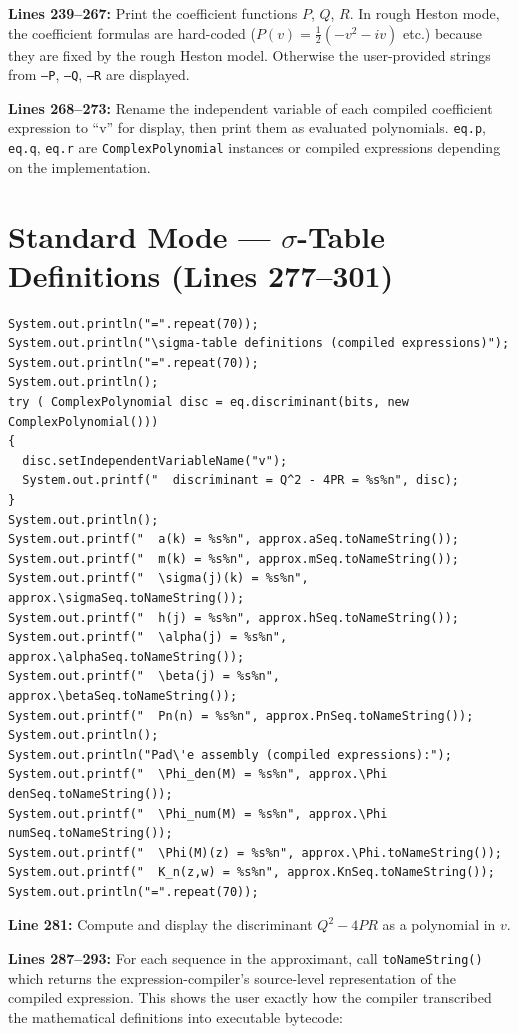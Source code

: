\documentclass[a4paper,11pt]{article}
\begin{document}
\textbf{Lines 239--267:} Print the coefficient functions $P$, $Q$, $R$. In
rough Heston mode, the coefficient formulas are hard-coded
($P(v) = \frac12(-v^2 - iv)$ etc.) because they are fixed by the rough Heston
model. Otherwise the user-provided strings from \texttt{--P}, \texttt{--Q},
\texttt{--R} are displayed.

\textbf{Lines 268--273:} Rename the independent variable of each compiled
coefficient expression to ``v'' for display, then print them as evaluated
polynomials. \texttt{eq.p}, \texttt{eq.q}, \texttt{eq.r} are
\texttt{ComplexPolynomial} instances or compiled expressions depending on the
implementation.

\section{Standard Mode --- $\sigma$-Table Definitions (Lines 277--301)}

\begin{lstlisting}[firstnumber=277]
System.out.println("=".repeat(70));
System.out.println("\sigma-table definitions (compiled expressions)");
System.out.println("=".repeat(70));
System.out.println();
try ( ComplexPolynomial disc = eq.discriminant(bits, new ComplexPolynomial()))
{
  disc.setIndependentVariableName("v");
  System.out.printf("  discriminant = Q^2 - 4PR = %s%n", disc);
}
System.out.println();
System.out.printf("  a(k) = %s%n", approx.aSeq.toNameString());
System.out.printf("  m(k) = %s%n", approx.mSeq.toNameString());
System.out.printf("  \sigma(j)(k) = %s%n", approx.\sigmaSeq.toNameString());
System.out.printf("  h(j) = %s%n", approx.hSeq.toNameString());
System.out.printf("  \alpha(j) = %s%n", approx.\alphaSeq.toNameString());
System.out.printf("  \beta(j) = %s%n", approx.\betaSeq.toNameString());
System.out.printf("  Pn(n) = %s%n", approx.PnSeq.toNameString());
System.out.println();
System.out.println("Pad\'e assembly (compiled expressions):");
System.out.printf("  \Phi_den(M) = %s%n", approx.\Phi denSeq.toNameString());
System.out.printf("  \Phi_num(M) = %s%n", approx.\Phi numSeq.toNameString());
System.out.printf("  \Phi(M)(z) = %s%n", approx.\Phi.toNameString());
System.out.printf("  K_n(z,w) = %s%n", approx.KnSeq.toNameString());
System.out.println("=".repeat(70));
\end{lstlisting}

\textbf{Line 281:} Compute and display the discriminant $Q^2 - 4PR$ as a
polynomial in $v$.

\textbf{Lines 287--293:} For each sequence in the approximant, call
\texttt{toNameString()} which returns the expression-compiler's source-level
representation of the compiled expression. This shows the user exactly how the
compiler transcribed the mathematical definitions into executable bytecode:
\end{document}
